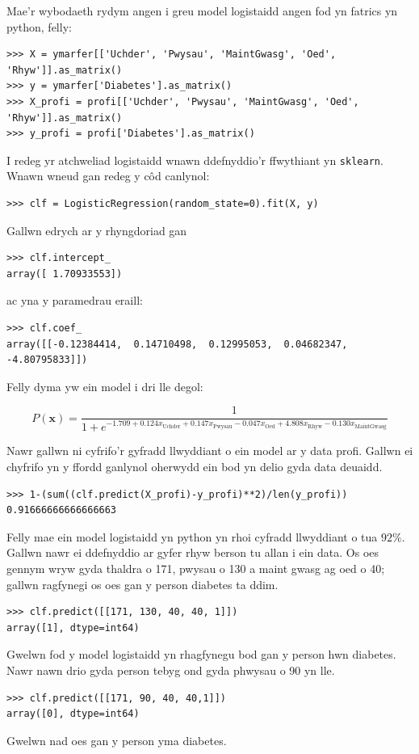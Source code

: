 Mae'r wybodaeth rydym angen i greu model logistaidd angen fod yn fatrics yn python, felly:

\begin{verbatim}
>>> X = ymarfer[['Uchder', 'Pwysau', 'MaintGwasg', 'Oed', 'Rhyw']].as_matrix()
>>> y = ymarfer['Diabetes'].as_matrix()
>>> X_profi = profi[['Uchder', 'Pwysau', 'MaintGwasg', 'Oed', 'Rhyw']].as_matrix()
>>> y_profi = profi['Diabetes'].as_matrix()
\end{verbatim}

I redeg yr atchweliad logistaidd wnawn ddefnyddio'r ffwythiant yn \texttt{sklearn}. Wnawn wneud gan redeg y c\^{o}d canlynol:

\begin{verbatim}
>>> clf = LogisticRegression(random_state=0).fit(X, y)
\end{verbatim}

Gallwn edrych ar y rhyngdoriad gan

\begin{verbatim}
>>> clf.intercept_
array([ 1.70933553])
\end{verbatim}

ac yna y paramedrau eraill:

\begin{verbatim}
>>> clf.coef_
array([[-0.12384414,  0.14710498,  0.12995053,  0.04682347, -4.80795833]])
\end{verbatim}

Felly dyma yw ein model i dri lle degol:

$$ P(\mathbf{x}) = \frac{1}{1 + e^{-1.709 + 0.124 x_{\text{Uchder}} + 0.147 x_{\text{Pwysau}} - 0.047 x_{\text{Oed}} + 4.808 x_{\text{Rhyw}} - 0.130 x_{\text{MaintGwasg}}}} $$

Nawr gallwn ni cyfrifo'r gyfradd llwyddiant o ein model ar y data profi. Gallwn ei chyfrifo yn y ffordd ganlynol oherwydd ein bod yn delio gyda data deuaidd.

\begin{verbatim}
>>> 1-(sum((clf.predict(X_profi)-y_profi)**2)/len(y_profi))
0.91666666666666663
\end{verbatim}

Felly mae ein model logistaidd yn python yn rhoi cyfradd llwyddiant o tua $92\%$. Gallwn nawr ei ddefnyddio ar gyfer rhyw berson tu allan i ein data. Os oes gennym wryw gyda thaldra o 171, pwysau o 130 a maint gwasg ag oed o 40; gallwn ragfynegi os oes gan y person diabetes ta ddim. 

\begin{verbatim}
>>> clf.predict([[171, 130, 40, 40, 1]])
array([1], dtype=int64)
\end{verbatim}

Gwelwn fod y model logistaidd yn rhagfynegu bod gan y person hwn diabetes. Nawr nawn drio gyda person tebyg ond gyda phwysau o 90 yn lle.

\begin{verbatim}
>>> clf.predict([[171, 90, 40, 40,1]])
array([0], dtype=int64)
\end{verbatim}

Gwelwn nad oes gan y person yma diabetes.